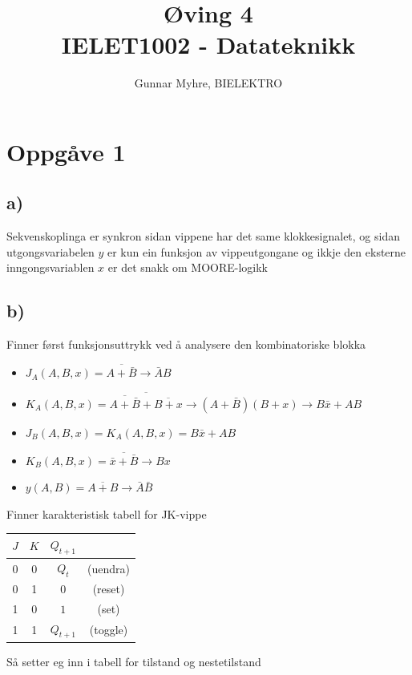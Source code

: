 \documentclass[12pt,a4paper]{article}
\title{%
  Øving 4 \\
  \large IELET1002 - Datateknikk \\
  }
\author{Gunnar Myhre, BIELEKTRO}
\newcommand{\N}{\overline}
\begin{document}
  \maketitle
  
  \section{Oppgåve 1}
    \subsection{a)}
      Sekvenskoplinga er synkron sidan vippene har det same klokkesignalet, og
      sidan utgongsvariabelen $y$ er kun ein funksjon av vippeutgongane og
      ikkje den eksterne inngongsvariablen $x$ er det snakk om MOORE-logikk
    \subsection{b)}
      Finner først funksjonsuttrykk ved å analysere den kombinatoriske blokka
      \begin{itemize}
        \item $J_A(A,B,x) = \N{A+\bar{B}} \rightarrow \bar{A}B$
        \item $K_A(A,B,x) = \N{ \N{A+\bar{B}} + \N{B+x}} \rightarrow (A+\bar{B})(B+x)
          \rightarrow B\bar{x} + AB$
        \item $J_B(A,B,x) = K_A(A,B,x) = B\bar{x} + AB$
        \item $K_B(A,B,x) = \N{\bar{x} + \bar{B}} \rightarrow Bx$
        \item $y(A,B) = \N{A + B} \rightarrow \bar{A}\bar{B}$
      \end{itemize}
      Finner karakteristisk tabell for JK-vippe
      \begin{center}
        \begin{tabular}{ |c|c|c c| }
          \hline
          $J$ & $K$ & $Q_{t+1}$ & \\
          \hline
          0 & 0 & $Q_t$ & (uendra) \\
          \hline
          0 & 1 & $0$ & (reset) \\
          \hline
          1 & 0 & $1$ & (set) \\
          \hline
          1 & 1 & $Q_{t+1}$ & (toggle) \\
          \hline
        \end{tabular}
      \end{center}
      Så setter eg inn i tabell for tilstand og nestetilstand
\end{document}
